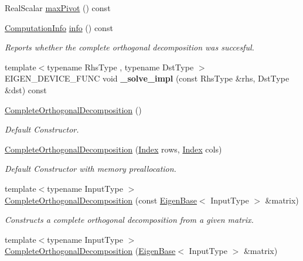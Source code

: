 \begin{DoxyCompactItemize}
\item 
Real\+Scalar \hyperlink{group___q_r___module_a5b712a58c13b7e5089be9228ec42f738}{max\+Pivot} () const
\item 
\hyperlink{group__enums_ga85fad7b87587764e5cf6b513a9e0ee5e}{Computation\+Info} \hyperlink{group___q_r___module_a1f5c45f78848cfdbb96963cefbbb3274}{info} () const
\begin{DoxyCompactList}\small\item\em Reports whether the complete orthogonal decomposition was succesful. \end{DoxyCompactList}\item 
\mbox{\label{group___q_r___module_a0b288fc8c0c84da06601d75aa5dc72fb}} 
{\footnotesize template$<$typename Rhs\+Type , typename Dst\+Type $>$ }\\E\+I\+G\+E\+N\+\_\+\+D\+E\+V\+I\+C\+E\+\_\+\+F\+U\+NC void {\bfseries \+\_\+solve\+\_\+impl} (const Rhs\+Type \&rhs, Dst\+Type \&dst) const
\item 
\hyperlink{group___q_r___module_a7ba33814fd3fdc62f6179cdcd655c679}{Complete\+Orthogonal\+Decomposition} ()
\begin{DoxyCompactList}\small\item\em Default Constructor. \end{DoxyCompactList}\item 
\hyperlink{group___q_r___module_aa6c282dd7452ebe754024edb71bebd09}{Complete\+Orthogonal\+Decomposition} (\hyperlink{namespace_eigen_a62e77e0933482dafde8fe197d9a2cfde}{Index} rows, \hyperlink{namespace_eigen_a62e77e0933482dafde8fe197d9a2cfde}{Index} cols)
\begin{DoxyCompactList}\small\item\em Default Constructor with memory preallocation. \end{DoxyCompactList}\item 
{\footnotesize template$<$typename Input\+Type $>$ }\\\hyperlink{group___q_r___module_afcfaf7a395f853247c23bb52b1ffb1cc}{Complete\+Orthogonal\+Decomposition} (const \hyperlink{group___core___module_struct_eigen_1_1_eigen_base}{Eigen\+Base}$<$ Input\+Type $>$ \&matrix)
\begin{DoxyCompactList}\small\item\em Constructs a complete orthogonal decomposition from a given matrix. \end{DoxyCompactList}\item 
{\footnotesize template$<$typename Input\+Type $>$ }\\\hyperlink{group___q_r___module_a082295ba2aac35a8b8b9e2d46e1d7ce4}{Complete\+Orthogonal\+Decomposition} (\hyperlink{group___core___module_struct_eigen_1_1_eigen_base}{Eigen\+Base}$<$ Input\+Type $>$ \&matrix)

\end{DoxyCompactItemize}
